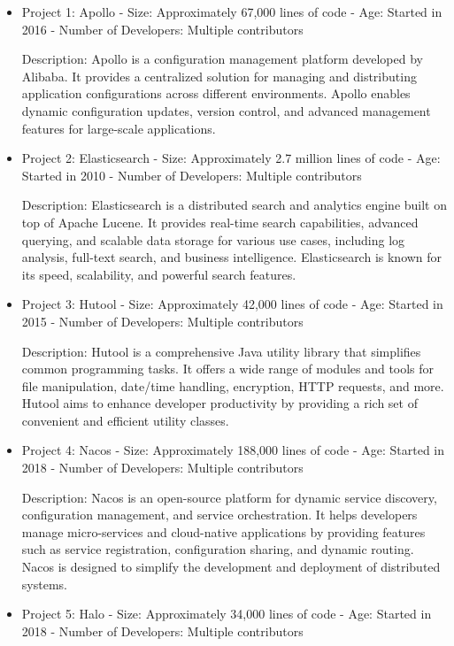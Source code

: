 \documentclass[conference]{IEEEtran}
\begin{document}
	\begin{itemize}
		\item Project 1: Apollo
		- Size: Approximately 67,000 lines of code
		- Age: Started in 2016
		- Number of Developers: Multiple contributors
		
		Description: Apollo is a configuration management platform developed by Alibaba. It provides a centralized solution for managing and distributing application configurations across different environments. Apollo enables dynamic configuration updates, version control, and advanced management features for large-scale applications.
		
		\item Project 2: Elasticsearch
		- Size: Approximately 2.7 million lines of code
		- Age: Started in 2010
		- Number of Developers: Multiple contributors
		
		Description: Elasticsearch is a distributed search and analytics engine built on top of Apache Lucene. It provides real-time search capabilities, advanced querying, and scalable data storage for various use cases, including log analysis, full-text search, and business intelligence. Elasticsearch is known for its speed, scalability, and powerful search features.
		
		\item Project 3: Hutool
		- Size: Approximately 42,000 lines of code
		- Age: Started in 2015
		- Number of Developers: Multiple contributors
		
		Description: Hutool is a comprehensive Java utility library that simplifies common programming tasks. It offers a wide range of modules and tools for file manipulation, date/time handling, encryption, HTTP requests, and more. Hutool aims to enhance developer productivity by providing a rich set of convenient and efficient utility classes.
		
		\item Project 4: Nacos
		- Size: Approximately 188,000 lines of code
		- Age: Started in 2018
		- Number of Developers: Multiple contributors
		
		Description: Nacos is an open-source platform for dynamic service discovery, configuration management, and service orchestration. It helps developers manage micro-services and cloud-native applications by providing features such as service registration, configuration sharing, and dynamic routing. Nacos is designed to simplify the development and deployment of distributed systems.
		
		\item Project 5: Halo
		- Size: Approximately 34,000 lines of code
		- Age: Started in 2018
		- Number of Developers: Multiple contributors
		

\end{itemize}
\end{document}
